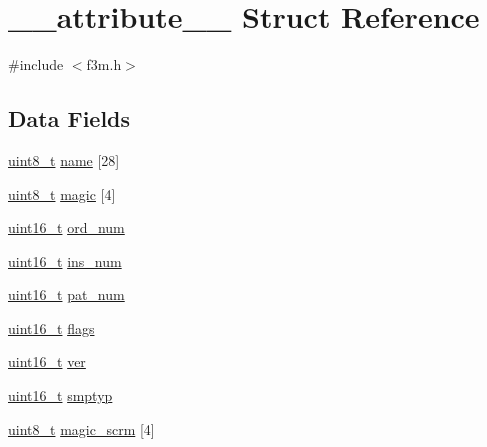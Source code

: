 \hypertarget{struct____attribute____}{}\section{\+\_\+\+\_\+attribute\+\_\+\+\_\+ Struct Reference}
\label{struct____attribute____}


{\ttfamily \#include $<$f3m.\+h$>$}

\subsection*{Data Fields}
\begin{DoxyCompactItemize}
\item 
\hyperlink{inttypes_8h_aba7bc1797add20fe3efdf37ced1182c5}{uint8\+\_\+t} \hyperlink{struct____attribute_____aad3f0ea9ec62c19485b020a9f704707f}{name} \mbox{[}28\mbox{]}
\item 
\hyperlink{inttypes_8h_aba7bc1797add20fe3efdf37ced1182c5}{uint8\+\_\+t} \hyperlink{struct____attribute_____a489bcfb2ab20fed0d93844f72a47c65f}{magic} \mbox{[}4\mbox{]}
\item 
\hyperlink{inttypes_8h_a273cf69d639a59973b6019625df33e30}{uint16\+\_\+t} \hyperlink{struct____attribute_____a256530209f2f3965eb7fbbf2a4fb2e32}{ord\+\_\+num}
\item 
\hyperlink{inttypes_8h_a273cf69d639a59973b6019625df33e30}{uint16\+\_\+t} \hyperlink{struct____attribute_____acf098ebb391cacc06907eddde1844318}{ins\+\_\+num}
\item 
\hyperlink{inttypes_8h_a273cf69d639a59973b6019625df33e30}{uint16\+\_\+t} \hyperlink{struct____attribute_____a71cb6430fc80fb29f3236726bebfa8e4}{pat\+\_\+num}
\item 
\hyperlink{inttypes_8h_a273cf69d639a59973b6019625df33e30}{uint16\+\_\+t} \hyperlink{struct____attribute_____aa0943b75cfebf20ce431adfbedf9f8c4}{flags}
\item 
\hyperlink{inttypes_8h_a273cf69d639a59973b6019625df33e30}{uint16\+\_\+t} \hyperlink{struct____attribute_____a06fbe8067948a00f7c7d3b3972f1b944}{ver}
\item 
\hyperlink{inttypes_8h_a273cf69d639a59973b6019625df33e30}{uint16\+\_\+t} \hyperlink{struct____attribute_____a3d366b118e7460cb27e82181ecad7dbc}{smptyp}
\item 
\hyperlink{inttypes_8h_aba7bc1797add20fe3efdf37ced1182c5}{uint8\+\_\+t} \hyperlink{struct____attribute_____aa2a56bd0e85dd9c7eb628f1eefb34d7d}{magic\+\_\+scrm} \mbox{[}4\mbox{]}
\item 

\end{DoxyCompactItemize}
